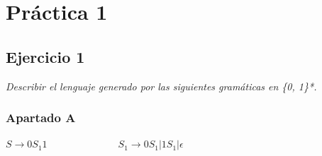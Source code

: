 \date{\normalsize\today} %





\maketitle %

\newpage %

\tableofcontents %


\listoffigures

\listoftables

\newpage

\section{Práctica 1}

\subsection{Ejercicio 1} 

\textit{Describir el lenguaje generado por las siguientes gramáticas en \{0, 1\}*.}

\subsubsection{Apartado A} 

\textit{$ S \rightarrow 0 S_{1} 1 \hspace{3cm} S_{1} \rightarrow 0S_{1} | 1S_{1} | \epsilon\ $} \newline

